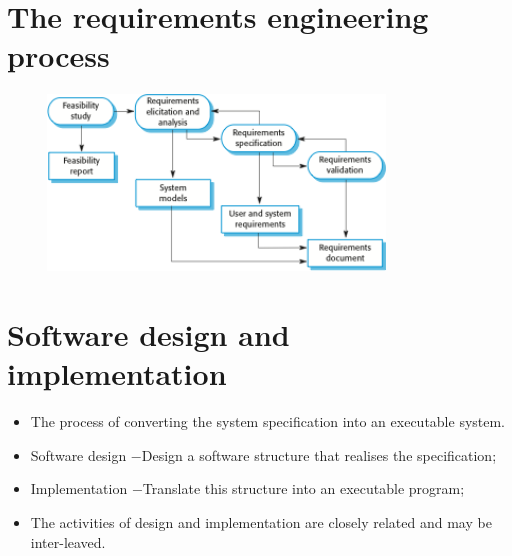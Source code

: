 \section{The requirements engineering process}
\begin{figure}[h!]
    \centering
    \includegraphics[width = 0.8\textwidth]{./figures/requirements_L1_4.png}
    \caption{}
    \label{fig:L1_4}
\end{figure}



\section{Software design and implementation}
\begin{itemize}

\item The process of converting the system specification into an executable system.

\item Software design
\newline $-$Design a software structure that realises the specification;
\item Implementation
\newline $-$Translate this structure into an executable program;

\item The activities of design and implementation are closely related and may be inter-leaved.
\end{itemize}

\newpage
